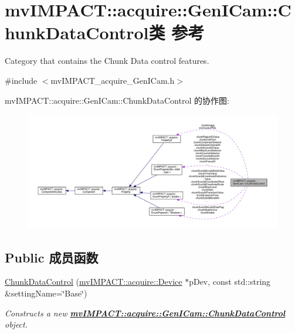\hypertarget{classmv_i_m_p_a_c_t_1_1acquire_1_1_gen_i_cam_1_1_chunk_data_control}{\section{mv\+I\+M\+P\+A\+C\+T\+:\+:acquire\+:\+:Gen\+I\+Cam\+:\+:Chunk\+Data\+Control类 参考}
\label{classmv_i_m_p_a_c_t_1_1acquire_1_1_gen_i_cam_1_1_chunk_data_control}
}


Category that contains the Chunk Data control features.  




{\ttfamily \#include $<$mv\+I\+M\+P\+A\+C\+T\+\_\+acquire\+\_\+\+Gen\+I\+Cam.\+h$>$}



mv\+I\+M\+P\+A\+C\+T\+:\+:acquire\+:\+:Gen\+I\+Cam\+:\+:Chunk\+Data\+Control 的协作图\+:
\nopagebreak
\begin{figure}[H]
\begin{center}
\leavevmode
\includegraphics[width=350pt]{classmv_i_m_p_a_c_t_1_1acquire_1_1_gen_i_cam_1_1_chunk_data_control__coll__graph}
\end{center}
\end{figure}
\subsection*{Public 成员函数}
\begin{DoxyCompactItemize}
\item 
\hyperlink{classmv_i_m_p_a_c_t_1_1acquire_1_1_gen_i_cam_1_1_chunk_data_control_aa4dbe6191aa44650f68e0a5c6bb3926c}{Chunk\+Data\+Control} (\hyperlink{classmv_i_m_p_a_c_t_1_1acquire_1_1_device}{mv\+I\+M\+P\+A\+C\+T\+::acquire\+::\+Device} $\ast$p\+Dev, const std\+::string \&setting\+Name=\char`\"{}Base\char`\"{})
\begin{DoxyCompactList}\small\item\em Constructs a new {\bfseries \hyperlink{classmv_i_m_p_a_c_t_1_1acquire_1_1_gen_i_cam_1_1_chunk_data_control}{mv\+I\+M\+P\+A\+C\+T\+::acquire\+::\+Gen\+I\+Cam\+::\+Chunk\+Data\+Control}} object. \end{DoxyCompactList}\end{DoxyCompactItemize}
